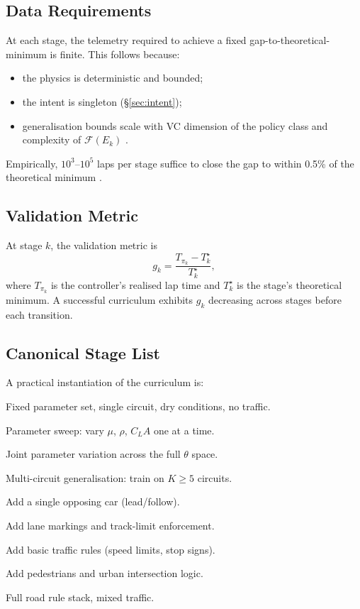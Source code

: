 \documentclass[11pt,twocolumn]{article}
\theoremstyle{definition}
\theoremstyle{remark}
\newcommand{\Feas}{\mathcal{F}}
\begin{document}
\subsection{Data Requirements}

At each stage, the telemetry required to achieve a fixed gap-to-theoretical-minimum is finite. This follows because:
\begin{itemize}[leftmargin=*,itemsep=2pt]
\item the physics is deterministic and bounded;
\item the intent is singleton (\S\ref{sec:intent});
\item generalisation bounds scale with VC dimension of the policy class and complexity of $\Feas(E_k)$ \cite{wasserman2013all,bartlett2002rademacher}.
\end{itemize}

Empirically, $10^3$--$10^5$ laps per stage suffice to close the gap to within 0.5\% of the theoretical minimum \cite{perantoni2014optimal,limebeer2015optimal}.

\subsection{Validation Metric}

At stage $k$, the validation metric is
\begin{equation}
g_k = \frac{T_{\pi_k} - T^{\star}_k}{T^{\star}_k},
\end{equation}
where $T_{\pi_k}$ is the controller's realised lap time and $T^{\star}_k$ is the stage's theoretical minimum. A successful curriculum exhibits $g_k$ decreasing across stages before each transition.

\subsection{Canonical Stage List}

A practical instantiation of the curriculum is:
\begin{description}[leftmargin=1em,labelindent=0em,style=nextline]
\item[Stage 1.] Fixed parameter set, single circuit, dry conditions, no traffic.
\item[Stage 2.] Parameter sweep: vary $\mu$, $\rho$, $C_L A$ one at a time.
\item[Stage 3.] Joint parameter variation across the full $\theta$ space.
\item[Stage 4.] Multi-circuit generalisation: train on $K \ge 5$ circuits.
\item[Stage 5.] Add a single opposing car (lead/follow).
\item[Stage 6.] Add lane markings and track-limit enforcement.
\item[Stage 7.] Add basic traffic rules (speed limits, stop signs).
\item[Stage 8.] Add pedestrians and urban intersection logic.
\item[Stage 9.] Full road rule stack, mixed traffic.
\end{description}
\end{document}
